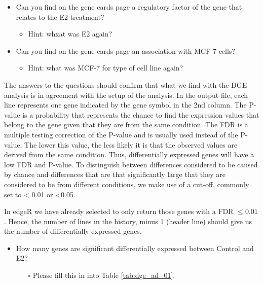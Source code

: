 \documentclass[11pt,a4paper]{article}
\begin{document}
\begin{itemize}
	\item Can you find on the gene cards page a regulatory factor of the gene that relates
to the E2 treatment?
	\begin{itemize}
		\item Hint: whxat was E2 again?
	\end{itemize}
	\item Can you find on the gene cards page an association with MCF-7 cells?
	\begin{itemize}
		\item Hint: what was MCF-7 for type of cell line again?
	\end{itemize}
\end{itemize}
The answers to the questions should confirm that what we find with the DGE analysis is in agreement with the setup of the analysis. In the output file, each line represents one gene indicated by the gene symbol in the 2nd column. The P-value is a probability that represents the chance to find the expression values that belong to the gene given that
they are from the same condition. The FDR is a multiple testing correction of the P-value and is usually used instead of the P-value. The lower this value, the less likely it is that the observed values are derived from the same condition. Thus, differentially expressed genes will have a low FDR and P-value. To distinguish between differences
considered to be caused by chance and differences that are that significantly large that they are considered to be from different conditions, we make use of a cut-off, commonly set to < 0.01 or <0.05.

In edgeR we have already selected to only return those genes with a FDR $\leq 0.01$. Hence, the number of lines in the history, minus 1 (header line) should give us the number of differentially expressed genes.
\begin{itemize}
	\item How many genes are significant differentially expressed between Control and E2? 
	\begin{itemize}
		\item[$\square$] Please fill this in into Table \ref{tab:dge_ad_01}.
	\end{itemize}
\end{itemize}



%
%


\vspace{-1.5em}

\end{document}

